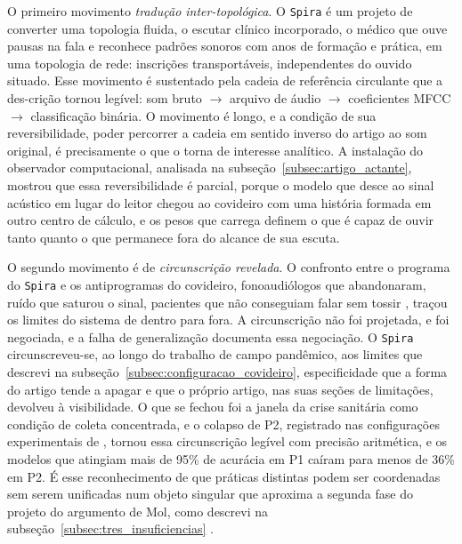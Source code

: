 O primeiro movimento \textit{tradução inter-topológica}. O \texttt{Spira} é um projeto de converter uma topologia fluida, o escutar clínico incorporado, o médico que ouve pausas na fala e reconhece padrões sonoros com anos de formação e prática, em uma topologia de rede: inscrições transportáveis, independentes do ouvido situado. Esse movimento é sustentado pela cadeia de referência circulante \parencite{Latour2017Esperanca} que a des-crição \parencite{Akrich1992Description} tornou legível: som bruto $\rightarrow$ arquivo de áudio $\rightarrow$ coeficientes MFCC $\rightarrow$ classificação binária. O movimento é longo, e a condição de sua reversibilidade, poder percorrer a cadeia em sentido inverso do artigo ao som original, é precisamente o que o torna de interesse analítico. A instalação do observador computacional, analisada na subseção~\ref{subsec:artigo_actante}, mostrou que essa reversibilidade é parcial, porque o modelo que desce ao sinal acústico em lugar do leitor chegou ao covideiro com uma história formada em outro centro de cálculo, e os pesos que carrega definem o que é capaz de ouvir tanto quanto o que permanece fora do alcance de sua escuta.

O segundo movimento é de \textit{circunscrição revelada}. O confronto entre o programa do \texttt{Spira} e os antiprogramas do covideiro, fonoaudiólogos que abandonaram, ruído que saturou o sinal, pacientes que não conseguiam falar sem tossir \parencite{Akrich1992Description,AkrichCallonLatour2002}, traçou os limites do sistema de dentro para fora. A circunscrição não foi projetada, e foi negociada, e a falha de generalização documenta essa negociação. O \texttt{Spira} circunscreveu-se, ao longo do trabalho de campo pandêmico, aos limites que descrevi na subseção~\ref{subsec:configuracao_covideiro}, especificidade que a forma do artigo tende a apagar e que o próprio artigo, nas suas seções de limitações, devolveu à visibilidade. O que se fechou foi a janela da crise sanitária como condição de coleta concentrada, e o colapso de P2, registrado nas configurações experimentais de \textcite{Gauy2024Discriminant}, tornou essa circunscrição legível com precisão aritmética, e os modelos que atingiam mais de 95\% de acurácia em P1 caíram para menos de 36\% em P2. É esse reconhecimento de que práticas distintas podem ser coordenadas sem serem unificadas num objeto singular que aproxima a segunda fase do projeto do argumento de Mol, como descrevi na subseção~\ref{subsec:tres_insuficiencias} \parencite{mol2002body}.

